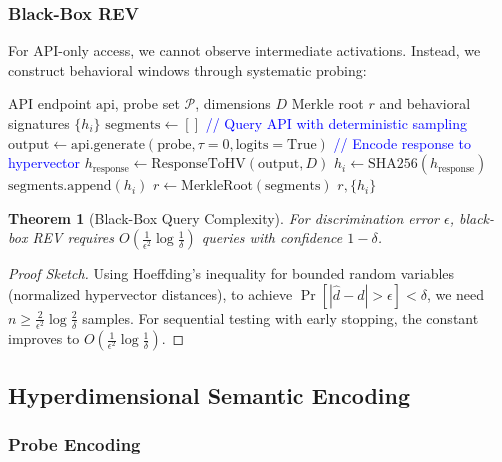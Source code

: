 \documentclass[11pt,a4paper]{article}
\newtheorem{theorem}{Theorem}
\begin{document}
\subsubsection{Black-Box REV}

For API-only access, we cannot observe intermediate activations. Instead, we construct behavioral windows through systematic probing:

\begin{algorithm}
\caption{Black-Box REV Execution}
\label{alg:rev-blackbox}
\begin{algorithmic}[1]
\Require API endpoint $\text{api}$, probe set $\mathcal{P}$, dimensions $D$
\Ensure Merkle root $r$ and behavioral signatures $\{h_i\}$
\State $\text{segments} \gets []$
    \State \textcolor{blue}{// Query API with deterministic sampling}
    \State $\text{output} \gets \text{api.generate}(\text{probe}, \tau=0, \text{logits}=\text{True})$
    \State \textcolor{blue}{// Encode response to hypervector}
    \State $h_{\text{response}} \gets \text{ResponseToHV}(\text{output}, D)$
    \State $h_i \gets \text{SHA256}(h_{\text{response}})$
    \State $\text{segments.append}(h_i)$
\EndFor
\State $r \gets \text{MerkleRoot}(\text{segments})$
\State \Return $r, \{h_i\}$
\end{algorithmic}
\end{algorithm}

\begin{theorem}[Black-Box Query Complexity]
For discrimination error $\epsilon$, black-box REV requires $O(\frac{1}{\epsilon^2} \log \frac{1}{\delta})$ queries with confidence $1-\delta$.
\end{theorem}

\begin{proof}[Proof Sketch]
Using Hoeffding's inequality for bounded random variables (normalized hypervector distances), to achieve $\Pr[|\hat{d} - d| > \epsilon] < \delta$, we need $n \geq \frac{2}{\epsilon^2} \log \frac{2}{\delta}$ samples. For sequential testing with early stopping, the constant improves to $O(\frac{1}{\epsilon^2} \log \frac{1}{\delta})$.
\end{proof}

\subsection{Hyperdimensional Semantic Encoding}

\subsubsection{Probe Encoding}
\end{document}

